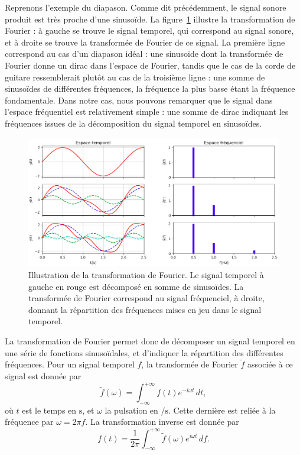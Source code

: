 \documentclass[11pt, twoside, a4paper, openright]{report}
\begin{document}
Reprenons l'exemple du diapason. Comme dit précédemment, le signal sonore produit est très proche d'une sinusoïde. La figure~\ref{fig:example_tf} illustre la transformation de Fourier : à gauche se trouve le signal temporel, qui correspond au signal sonore, et à droite se trouve la transformée de Fourier de ce signal.
La première ligne correspond au cas d'un diapason idéal :
une sinusoïde dont la transformée de Fourier donne un dirac dans l'espace de Fourier, tandis que le cas de la corde de guitare ressemblerait plutôt au cas de la troisième ligne :
une somme de sinusoïdes de différentes fréquences, la fréquence la plus basse étant la fréquence fondamentale. Dans notre cas, nous pouvons remarquer que le signal dans l'espace fréquentiel est relativement simple : une somme de dirac indiquant les fréquences issues de la décomposition du signal temporel en sinusoïdes.
\begin{figure}[h]
  \centering
  \includegraphics[scale=0.5]{example_tf}
  \caption{Illustration de la transformation de Fourier. Le signal temporel à gauche en rouge est décomposé en somme de sinusoïdes. La transformée de Fourier correspond au signal fréquenciel, à droite, donnant la répartition des fréquences mises en jeu dans le signal temporel.}
  \label{fig:example_tf}
\end{figure}

La transformation de Fourier permet donc de décomposer un signal temporel en une série de fonctions sinusoïdales, et d'indiquer la répartition des différentes fréquences. Pour un signal temporel $f$, la transformée de Fourier $\tilde f$ associée à ce signal est donnée par
\begin{equation}
  \label{eq:def_tf}
  \tilde f(\omega) = \int_{-\infty}^{+\infty}f(t) e^{- i \omega t} \,dt ,
\end{equation}
où $t$ est le temps en $\si{\second}$, et $\omega$ la pulsation en $\si{\per\second}$. Cette dernière est reliée à la fréquence par $\omega = 2 \pi f$. La transformation inverse est donnée par
\begin{equation}
  \label{eq:def_tf_inv}
   f(t) = \frac{1}{2 \pi}\int_{-\infty}^{+\infty} \tilde f(\omega) e^{ i \omega t} \,df .
\end{equation}
\end{document}
